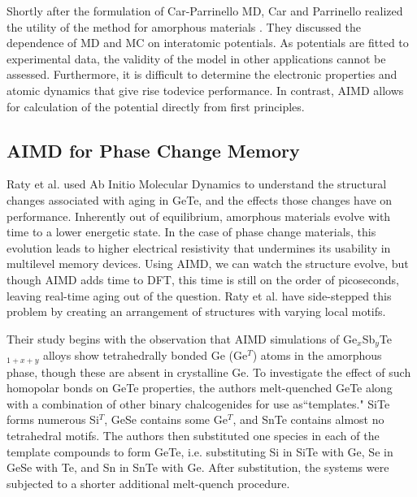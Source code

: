 \documentclass[3p,review,12pt]{elsarticle}
\begin{document}
\par
Shortly after the formulation of Car-Parrinello MD, Car and Parrinello realized the utility of the method for amorphous materials \cite{Car1988}. They discussed the dependence of MD and MC on interatomic potentials. As potentials are fitted to experimental data, the validity of the model in other applications cannot be assessed. Furthermore, it is difficult to determine the electronic properties and atomic dynamics that give rise todevice performance. In contrast, AIMD allows for calculation of the potential directly from first principles.

\subsection{AIMD for Phase Change Memory}
Raty et al. \cite{Raty2015} used Ab Initio Molecular Dynamics to understand the structural changes associated with aging in GeTe, and the effects those changes have on performance. Inherently out of equilibrium, amorphous materials evolve with time to a lower energetic state. In the case of phase change materials, this evolution leads to higher electrical resistivity that undermines its usability in multilevel memory devices. Using AIMD, we can watch the structure evolve, but though AIMD adds time to DFT, this time is still on the order of picoseconds, leaving real-time aging out of the question. Raty et al. have side-stepped this problem by creating an arrangement of structures with varying local motifs. 
\par
Their study begins with the observation that AIMD simulations of Ge$_{x}$Sb$_{y}$Te$_{1+x+y}$ alloys show tetrahedrally bonded Ge (Ge$^{T}$) atoms in the amorphous phase, though these are absent in crystalline Ge. To investigate the effect of such homopolar bonds on GeTe properties, the authors melt-quenched GeTe along with a combination of other binary chalcogenides for use as``templates." SiTe forms numerous Si$^{T}$, GeSe contains some Ge$^{T}$, and SnTe contains almost no tetrahedral motifs.  The authors then substituted one species in each of the template compounds to form GeTe, i.e. substituting Si in SiTe with Ge, Se in GeSe with Te, and Sn in SnTe with Ge. After substitution, the systems were subjected to a shorter additional melt-quench procedure.
\end{document}
